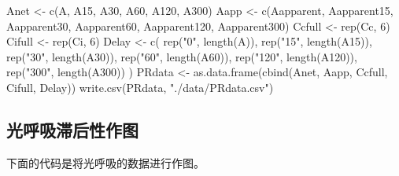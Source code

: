\documentclass[
]{krantz}
\makeatletter
\newenvironment{Shaded}{\begin{snugshade}}{\end{snugshade}}
\newcommand{\DecValTok}[1]{\textcolor[rgb]{0.00,0.00,0.81}{#1}}
\newcommand{\FunctionTok}[1]{\textcolor[rgb]{0.00,0.00,0.00}{#1}}
\newcommand{\NormalTok}[1]{#1}
\newcommand{\OtherTok}[1]{\textcolor[rgb]{0.56,0.35,0.01}{#1}}
\newcommand{\StringTok}[1]{\textcolor[rgb]{0.31,0.60,0.02}{#1}}
\newenvironment{kframe}{%
\medskip{}
\setlength{\fboxsep}{.8em}
 \def\at@end@of@kframe{}%
 \ifinner\ifhmode%
  \def\at@end@of@kframe{\end{minipage}}%
  \begin{minipage}{\columnwidth}%
 \fi\fi%
 \def\FrameCommand##1{\hskip\@totalleftmargin \hskip-\fboxsep
 \colorbox{shadecolor}{##1}\hskip-\fboxsep
     \hskip-\linewidth \hskip-\@totalleftmargin \hskip\columnwidth}%
 \MakeFramed {\advance\hsize-\width
   \@totalleftmargin\z@ \linewidth\hsize
   \@setminipage}}%
 {\par\unskip\endMakeFramed%
 \at@end@of@kframe}
\renewenvironment{Shaded}{\begin{kframe}}{\end{kframe}}
\makeatother
\begin{document}
\begin{Shaded}
\begin{Highlighting}[]
\NormalTok{Anet }\OtherTok{\textless{}{-}} \FunctionTok{c}\NormalTok{(A, A15, A30, A60, A120, A300)}
\NormalTok{Aapp }\OtherTok{\textless{}{-}}
  \FunctionTok{c}\NormalTok{(Aapparent,}
\NormalTok{    Aapparent15,}
\NormalTok{    Aapparent30,}
\NormalTok{    Aapparent60,}
\NormalTok{    Aapparent120,}
\NormalTok{    Aapparent300)}
\NormalTok{Ccfull }\OtherTok{\textless{}{-}} \FunctionTok{rep}\NormalTok{(Cc, }\DecValTok{6}\NormalTok{)}
\NormalTok{Cifull }\OtherTok{\textless{}{-}} \FunctionTok{rep}\NormalTok{(Ci, }\DecValTok{6}\NormalTok{)}
\NormalTok{Delay }\OtherTok{\textless{}{-}}
  \FunctionTok{c}\NormalTok{(}
    \FunctionTok{rep}\NormalTok{(}\StringTok{"0"}\NormalTok{, }\FunctionTok{length}\NormalTok{(A)),}
    \FunctionTok{rep}\NormalTok{(}\StringTok{"15"}\NormalTok{, }\FunctionTok{length}\NormalTok{(A15)),}
    \FunctionTok{rep}\NormalTok{(}\StringTok{"30"}\NormalTok{, }\FunctionTok{length}\NormalTok{(A30)),}
    \FunctionTok{rep}\NormalTok{(}\StringTok{"60"}\NormalTok{, }\FunctionTok{length}\NormalTok{(A60)),}
    \FunctionTok{rep}\NormalTok{(}\StringTok{"120"}\NormalTok{, }\FunctionTok{length}\NormalTok{(A120)),}
    \FunctionTok{rep}\NormalTok{(}\StringTok{"300"}\NormalTok{, }\FunctionTok{length}\NormalTok{(A300))}
\NormalTok{  )}
\NormalTok{PRdata }\OtherTok{\textless{}{-}} \FunctionTok{as.data.frame}\NormalTok{(}\FunctionTok{cbind}\NormalTok{(Anet, Aapp, Ccfull, Cifull, Delay))}
\FunctionTok{write.csv}\NormalTok{(PRdata, }\StringTok{"./data/PRdata.csv"}\NormalTok{)}
\end{Highlighting}
\end{Shaded}

\hypertarget{multi5}{%
\subsection{光呼吸滞后性作图}\label{multi5}}

下面的代码是将光呼吸的数据进行作图。
\end{document}
